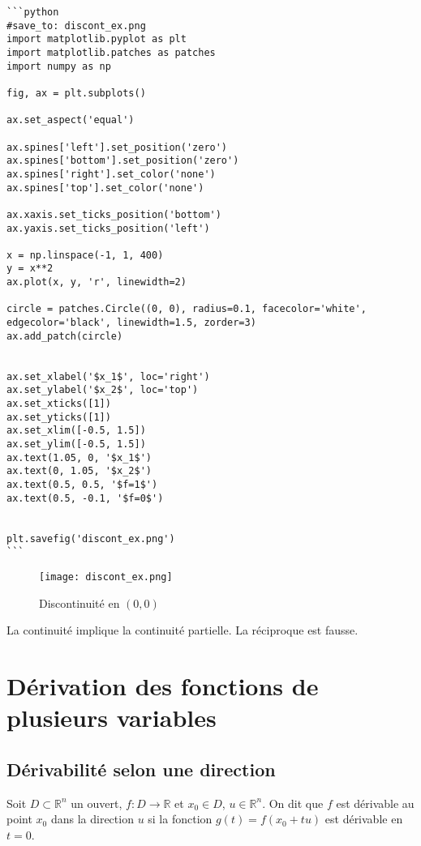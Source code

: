 \documentclass[oneside]{book}
\begin{document}
\begin{verbatim}
```python
#save_to: discont_ex.png
import matplotlib.pyplot as plt
import matplotlib.patches as patches
import numpy as np

fig, ax = plt.subplots()

ax.set_aspect('equal')

ax.spines['left'].set_position('zero')
ax.spines['bottom'].set_position('zero')
ax.spines['right'].set_color('none')
ax.spines['top'].set_color('none')

ax.xaxis.set_ticks_position('bottom')
ax.yaxis.set_ticks_position('left')

x = np.linspace(-1, 1, 400)
y = x**2
ax.plot(x, y, 'r', linewidth=2)

circle = patches.Circle((0, 0), radius=0.1, facecolor='white', edgecolor='black', linewidth=1.5, zorder=3)
ax.add_patch(circle)


ax.set_xlabel('$x_1$', loc='right')
ax.set_ylabel('$x_2$', loc='top')
ax.set_xticks([1])
ax.set_yticks([1])
ax.set_xlim([-0.5, 1.5])
ax.set_ylim([-0.5, 1.5])
ax.text(1.05, 0, '$x_1$')
ax.text(0, 1.05, '$x_2$')
ax.text(0.5, 0.5, '$f=1$')
ax.text(0.5, -0.1, '$f=0$')


plt.savefig('discont_ex.png')
```
\end{verbatim}

\begin{figure}[h]
\centering
\texttt{[image: discont\_ex.png]}
\caption{Discontinuité en $(0,0)$}
\label{fig:discont_ex}
\end{figure}


\begin{remark}
La continuité implique la continuité partielle. La réciproque est fausse.
\end{remark}

\section{Dérivation des fonctions de plusieurs variables}

\subsection{Dérivabilité selon une direction}

\begin{definition}
Soit $D \subset \mathbb{R}^n$ un ouvert, $f: D \rightarrow \mathbb{R}$ et $x_0 \in D$, $u \in \mathbb{R}^n$. On dit que $f$ est dérivable au point $x_0$ dans la direction $u$ si la fonction $g(t) = f(x_0 + tu)$ est dérivable en $t = 0$.
\end{definition}
\end{document}
